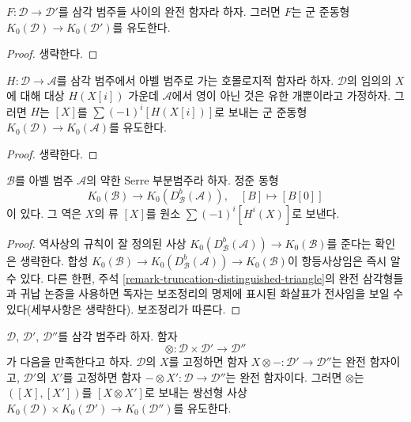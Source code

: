 \begin{lemma}
\label{lemma-map-K}
$F : \mathcal{D} \to \mathcal{D}'$를 삼각 범주들 사이의 완전 함자라
하자. 그러면 $F$는 군 준동형
$K_0(\mathcal{D}) \to K_0(\mathcal{D}')$를 유도한다.
\end{lemma}

\begin{proof}
생략한다.
\end{proof}

\begin{lemma}
\label{lemma-homological-map-K}
$H : \mathcal{D} \to \mathcal{A}$를 삼각 범주에서 아벨 범주로 가는
호몰로지적 함자라 하자. $\mathcal{D}$의 임의의 $X$에 대해 대상
$H(X[i])$ 가운데 $\mathcal{A}$에서 영이 아닌 것은 유한 개뿐이라고
가정하자. 그러면 $H$는 $[X]$를 $\sum (-1)^i[H(X[i])]$로 보내는
군 준동형 $K_0(\mathcal{D}) \to K_0(\mathcal{A})$를 유도한다.
\end{lemma}

\begin{proof}
생략한다.
\end{proof}

\begin{lemma}
\label{lemma-DBA-map-K}
$\mathcal{B}$를 아벨 범주 $\mathcal{A}$의 약한 Serre 부분범주라 하자.
정준 동형
$$
K_0(\mathcal{B}) \longrightarrow
K_0(D^b_\mathcal{B}(\mathcal{A})),\quad
[B] \longmapsto [B[0]]
$$
이 있다. 그 역은 $X$의 류 $[X]$를 원소
$\sum (-1)^i[H^i(X)]$로 보낸다.
\end{lemma}

\begin{proof}
역사상의 규칙이 잘 정의된 사상
$K_0(D^b_\mathcal{B}(\mathcal{A})) \to K_0(\mathcal{B})$를
준다는 확인은 생략한다. 합성
$K_0(\mathcal{B}) \to
K_0(D^b_\mathcal{B}(\mathcal{A})) \to
K_0(\mathcal{B})$이 항등사상임은 즉시 알 수 있다. 다른 한편,
주석 \ref{remark-truncation-distinguished-triangle}의 완전 삼각형들과
귀납 논증을 사용하면 독자는 보조정리의 명제에 표시된 화살표가
전사임을 보일 수 있다(세부사항은 생략한다). 보조정리가 따른다.
\end{proof}

\begin{lemma}
\label{lemma-bilinear-map-K}
$\mathcal{D}$, $\mathcal{D}'$, $\mathcal{D}''$를 삼각 범주라 하자.
함자
$$
\otimes : \mathcal{D} \times \mathcal{D}' \longrightarrow \mathcal{D}''
$$
가 다음을 만족한다고 하자. $\mathcal{D}$의 $X$를 고정하면 함자
$X \otimes - : \mathcal{D}' \to \mathcal{D}''$는 완전 함자이고,
$\mathcal{D}'$의 $X'$를 고정하면 함자
$- \otimes X' : \mathcal{D} \to \mathcal{D}''$는 완전 함자이다.
그러면 $\otimes$는 $([X], [X'])$를 $[X \otimes X']$로 보내는
쌍선형 사상
$K_0(\mathcal{D}) \times K_0(\mathcal{D}') \to K_0(\mathcal{D}'')$를
유도한다.
\end{lemma}


